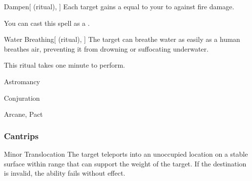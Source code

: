 \lowercase{\hypertarget{spell:Dampen}{}}\label{spell:Dampen}
\begin{attuneability}[Rank 1]{\hypertarget{spell:Dampen}{Dampen}}[ (ritual), ]
Each target gains a  equal to your  to  against fire damage.

You can cast this spell as a .
\end{attuneability}
\vspace{0.25em}



\lowercase{\hypertarget{spell:Water Breathing}{}}\label{spell:Water Breathing}
\begin{attuneability}[Rank 3]{\hypertarget{spell:Water Breathing}{Water Breathing}}[ (ritual), ]
The target can breathe water as easily as a human breathes air, preventing it from drowning or suffocating underwater.

This ritual takes one minute to perform.
\end{attuneability}
\vspace{0.25em}


\newpage
\begin{spellsection}{Astromancy}

\begin{spellheader}
\end{spellheader}


 Conjuration

 Arcane, Pact

\subsubsection{Cantrips}


\begin{freeability}{Minor Translocation}
The target teleports into an unoccupied location on a stable surface within range that can support the weight of the target.
If the destination is invalid, the ability fails without effect.
\end{freeability}

\end{spellsection}


